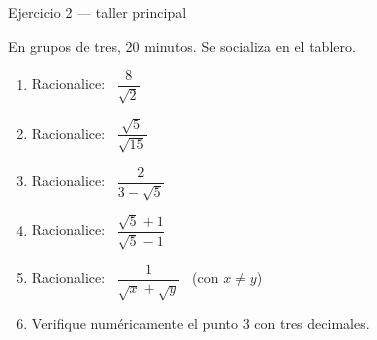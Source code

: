 \documentclass[aspectratio=169,10pt]{beamer}
\begin{document}
\begin{frame}{Ejercicio 2 — taller principal}
  \begin{alertblock}{En grupos de tres, 20 minutos. Se socializa en el tablero.}
    \scriptsize
    \begin{enumerate}\setlength{\itemsep}{0.0cm}
      \item Racionalice: \ $\dfrac{8}{\sqrt{2}}$
      \item Racionalice: \ $\dfrac{\sqrt{5}}{\sqrt{15}}$
      \item Racionalice: \ $\dfrac{2}{3-\sqrt{5}}$
      \item Racionalice: \ $\dfrac{\sqrt{5}+1}{\sqrt{5}-1}$
      \item Racionalice: \ $\dfrac{1}{\sqrt{x}+\sqrt{y}}$ \ (con $x\neq y$)
      \item Verifique numéricamente el punto 3 con tres decimales.
    \end{enumerate}
  \end{alertblock}
\end{frame}
\end{document}
